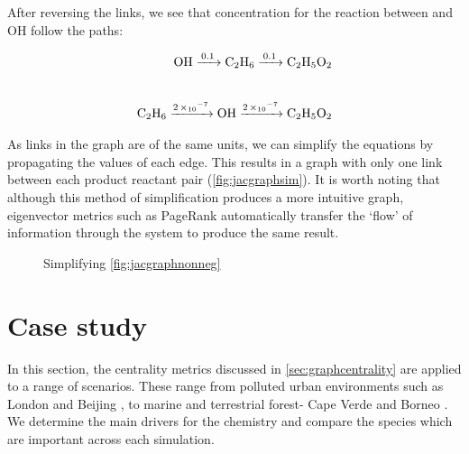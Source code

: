 After reversing the links, we see that concentration for the reaction between  and OH follow the paths: 

\begin{eqnarray}
    \ce{OH ->[0.1] C2H6 ->[0.1] C2H5O2} \\[20pt]
    \ce{C2H6 ->[2\times10^{-7}] OH ->[2\times10^{-7}] C2H5O2}
\end{eqnarray}



As links in the graph are of the same units, we can simplify the equations by propagating the values of each edge.  This results in a graph with only one link between each product reactant pair (\autoref{fig:jacgraphsim}). It is worth noting that although this method of simplification produces a more intuitive graph, eigenvector metrics such as PageRank automatically transfer the `flow' of information through the system to produce the same result.

\begin{figure}[H]
\begin{center}

\end{center}

\caption{ Simplifying \autoref{fig:jacgraphnonneg}}
\label{fig:jacgraphsim}
\end{figure}


\section{Case study}\label{sec:metriccase}
In this section, the centrality metrics discussed in \autoref{sec:graphcentrality} are applied to a range of scenarios. These range from polluted urban environments such as London \citep{clfo} and Beijing \cite{aphh}, to marine and terrestrial forest- Cape Verde \cite{capeverde} and Borneo \citep{borneo}. We determine the main drivers for the chemistry and compare the species which are important across each simulation.  

